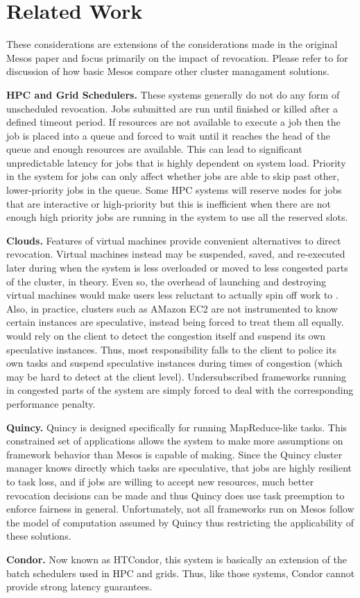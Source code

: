 \section{Related Work}
These considerations are extensions of the considerations made in the original Mesos paper and
focus primarily on the impact of revocation. Please refer to \cite{mesos-paper} for discussion of how basic
Mesos compare other cluster managament solutions.

\textbf{HPC and Grid Schedulers.} These systems generally do not do any form of unscheduled
revocation. Jobs submitted are run until finished or killed after a defined timeout period.
If resources are not available to execute a job then the job is placed into a queue and forced
to wait until it reaches the head of the queue and enough resources are available. This can
lead to significant unpredictable latency for jobs that is highly dependent on system load.
Priority in the system for jobs can only affect whether jobs are able to skip past other,
lower-priority jobs in the queue. Some HPC systems will reserve nodes for jobs that are
interactive or high-priority but this is inefficient when there are not enough high priority
jobs are running in the system to use all the reserved slots.

\textbf{Clouds.} Features of virtual machines provide convenient alternatives to direct
revocation. Virtual machines instead may be suspended, saved, and re-executed later during when
the system is less overloaded or moved to less congested parts of the cluster, in theory. Even
so, the overhead of launching and destroying virtual machines would make users less reluctant
to actually spin off work to . Also, in practice, clusters such as AMazon EC2 are not
instrumented to know certain instances are speculative, instead being forced to treat them all
equally.  would rely on the client to detect the congestion itself and suspend its own
speculative instances. Thus, most responsibility falls to the client to police its own tasks
and suspend speculative instances during times of congestion (which may be hard to detect at
the client level). Undersubscribed frameworks running in congested parts of the system are
simply forced to deal with the corresponding performance penalty.

\textbf{Quincy.} Quincy is designed specifically for running MapReduce-like tasks. This
constrained set of applications allows the system to make more assumptions on framework
behavior than Mesos is capable of making. Since the Quincy cluster manager knows directly which
tasks are speculative, that jobs are highly resilient to task loss, and if jobs are willing to
accept new resources, much better revocation decisions can be made and thus Quincy does use
task preemption to enforce fairness in general. Unfortunately, not all frameworks run on Mesos
follow the model of computation assumed by Quincy thus restricting the applicability of these
solutions.

\textbf{Condor.} Now known as HTCondor, this system is basically an extension of the batch
schedulers used in HPC and grids. Thus, like those systems, Condor cannot provide strong
latency guarantees.
